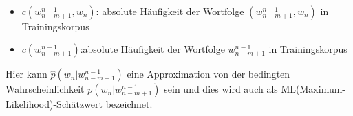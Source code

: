 \\
\begin{itemize}
	\item $c(w_{n-m+1}^{n-1},w_{n})$: absolute H\"aufigkeit der Wortfolge $(w_{n-m+1}^{n-1},w_{n})$ in Trainingskorpus\\
	\item $c(w_{n-m+1}^{n-1})$:absolute H\"aufigkeit der Wortfolge $w_{n-m+1}^{n-1}$ in Trainingskorpus\\
\end{itemize}
Hier kann $\hat{p}(w_{n}|w_{n-m+1}^{n-1})$  eine Approximation von der bedingten Wahrscheinlichkeit $p(w_{n}|w_{n-m+1}^{n-1})$ sein und dies wird auch als ML(Maximum-Likelihood)-Sch\"atzwert bezeichnet.\\

